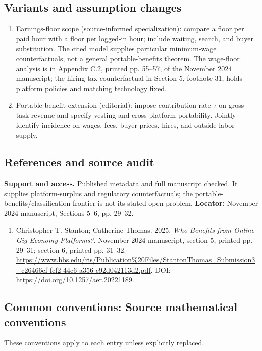 \documentclass[11pt,a4paper]{article}
\begin{document}
\subsection*{Variants and assumption changes}
\begin{enumerate}
\item Earnings-floor scope (source-informed specialization): compare a floor per paid hour with a floor per logged-in hour; include waiting, search, and buyer substitution. The cited model supplies particular minimum-wage counterfactuals, not a general portable-benefits theorem. The wage-floor analysis is in Appendix C.2, printed pp. 55--57, of the November 2024 manuscript; the hiring-tax counterfactual in Section 5, footnote 31, holds platform policies and matching technology fixed.
\item Portable-benefit extension (editorial): impose contribution rate \(\tau\) on gross task revenue and specify vesting and cross-platform portability. Jointly identify incidence on wages, fees, buyer prices, hires, and outside labor supply.
\end{enumerate}
\subsection*{References and source audit}
\textbf{Support and access.} Published metadata and full manuscript checked. It supplies platform-surplus and regulatory counterfactuals; the portable-benefits/classification frontier is not its stated open problem. \textbf{Locator:} November 2024 manuscript, Sections 5--6, pp. 29--32.
\begin{enumerate}\raggedright
\item\hypertarget{definitions:source:30007639:1}{} Christopher T. Stanton; Catherine Thomas. 2025. \emph{Who Benefits from Online Gig Economy Platforms?}. November 2024 manuscript, section 5, printed pp. 29–31; section 6, printed pp. 31–32.
\url{https://www.hbs.edu/ris/Publication%20Files/StantonThomas_Submission3_c26466ef-fcf2-44c6-a356-c92d042113d2.pdf}.
DOI: \url{https://doi.org/10.1257/aer.20221189}.
\end{enumerate}

\subsection*{Common conventions: Source mathematical conventions}

These conventions apply to each entry unless explicitly replaced.
\end{document}
